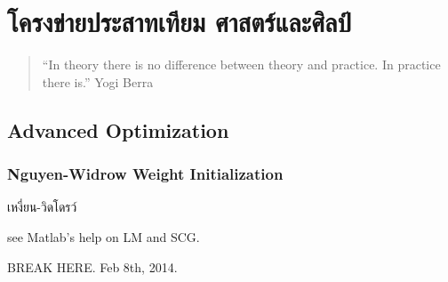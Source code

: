 \chapter{โครงข่ายประสาทเทียม ศาสตร์และศิลป์}

\begin{verse}
``In theory there is no difference between theory and practice. 
In practice there is.''
Yogi Berra
\end{verse}


\section{Advanced Optimization}
\label{sec: ann advanced optimization}

\subsection{Nguyen-Widrow Weight Initialization}
\label{sec: Nguyen-Widrow Weight Initialization}

เหงี่ยน-วิดโดรว์

see Matlab's help on LM and SCG.

BREAK HERE. Feb 8th, 2014.
